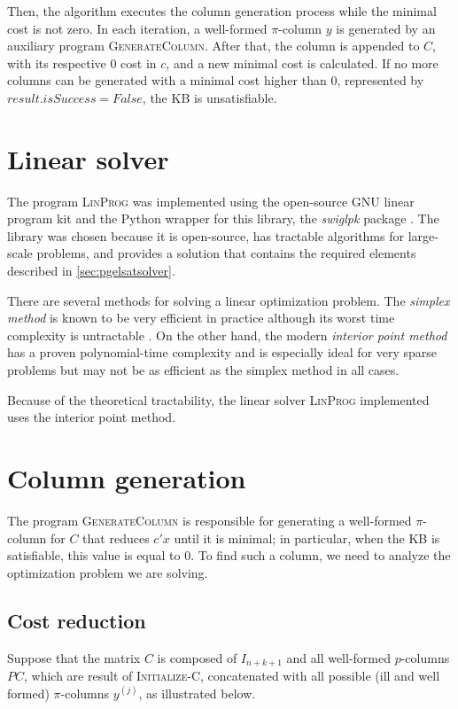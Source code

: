 Then, the algorithm executes the column generation process while the minimal cost is not zero. In each iteration, a well-formed $\pi$-column $y$ is generated by an auxiliary program \textsc{GenerateColumn}. After that, the column is appended to $C$, with its respective $0$ cost in $c$, and a new minimal cost is calculated. If no more columns can be generated with a minimal cost higher than $0$, represented by $result.isSuccess = False$, the KB is unsatisfiable.  

\section{Linear solver}
The program \textsc{LinProg} was implemented using the open-source GNU linear program kit \citep{makhorin2001gnu} and the Python wrapper for this library, the \emph{swiglpk} package \citep{swiglpk}. The library was chosen because it is open-source, has tractable algorithms for large-scale problems, and provides a solution that contains the required elements described in \autoref{sec:pgelsatsolver}. 

There are several methods for solving a linear optimization problem. The \emph{simplex method} is known to be very efficient in practice \citep{borgwardt2012simplex} although its worst time complexity is untractable \citep{klee1972good}. On the other hand, the modern \emph{interior point method} has a proven polynomial-time complexity and is especially ideal for very sparse problems \citep{boyd2004convex} but may not be as efficient as the simplex method in all cases.

Because of the theoretical tractability, the linear solver \textsc{LinProg} implemented uses the interior point method.

\section{Column generation}
The program \textsc{GenerateColumn} is responsible for generating a well-formed $\pi$-column for $C$ that reduces $c' x$ until it is minimal; in particular, when the KB is satisfiable, this value is equal to 0. To find such a column, we need to analyze the optimization problem we are solving.

\subsection{Cost reduction}

Suppose that the matrix $C$ is composed of $I_{n+k+1}$ and all well-formed $p$-columns $PC$, which are result of \textsc{Initialize-C}, concatenated with all possible (ill and well formed) $\pi$-columns $y^{(j)}$, as illustrated below. 

